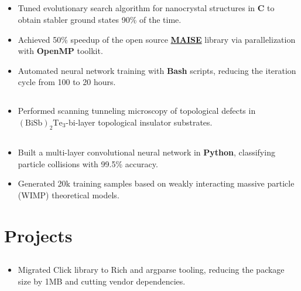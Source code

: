 \documentclass{article}
\newcommand{\subsubsectiontext}[1]{
    \hspace*{.5cm}%
    \begin{minipage}{.9\textwidth}%
    #1
    \end{minipage}%
}
\begin{document}
\subsection{}
\subsubsectiontext{
    \begin{itemize}
    \item Tuned evolutionary search algorithm for nanocrystal structures in \textbf{C} to obtain stabler ground states 90\% of the time.
    \item Achieved 50\% speedup of the open source \href{https://maise.binghamton.edu/}{\textbf{MAISE}} library via parallelization with \textbf{OpenMP} toolkit.
    \item Automated neural network training with \textbf{Bash} scripts, reducing the iteration cycle from 100 to 20 hours.
\end{itemize}
}

\subsection{}
\subsubsectiontext{
\begin{itemize}
    \item Performed scanning tunneling microscopy of topological defects in $(\text{BiSb})_{2}\text{Te}_{3}$-bi-layer topological insulator substrates.
\end{itemize}
}

\subsection{}
\subsubsectiontext{
    \begin{itemize}
        \item Built a multi-layer convolutional neural network in \textbf{Python}, classifying particle collisions with 99.5\% accuracy.
        \item Generated 20k training samples based on weakly interacting massive particle (WIMP) theoretical models.
    \end{itemize}
}

\section{Projects}

\subsection{}
\subsubsectiontext{
\begin{itemize}
    \item Migrated Click library to Rich and argparse tooling, reducing the package size by 1MB and cutting vendor dependencies.
\end{itemize}
}
\end{document}
